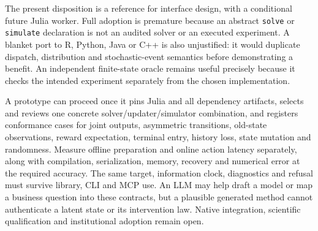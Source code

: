 The present disposition is a reference for interface design, with a conditional
future Julia worker. Full adoption is premature because an abstract
\texttt{solve} or \texttt{simulate} declaration is not an audited solver or
an executed experiment. A blanket port to R, Python, Java or C++ is also
unjustified: it would duplicate dispatch, distribution and stochastic-event
semantics before demonstrating a benefit. An independent finite-state oracle
remains useful precisely because it checks the intended experiment separately
from the chosen implementation.
\citep{exec23_pomdpsjl_sources,exec23_pomdpsjl_reference}

A prototype can proceed once it pins Julia and all dependency artifacts,
selects and reviews one concrete solver/updater/simulator combination, and
registers conformance cases for joint outputs, asymmetric transitions,
old-state observations, reward expectation, terminal entry, history loss,
state mutation and randomness. Measure offline preparation and online action
latency separately, along with compilation, serialization, memory, recovery
and numerical error at the required accuracy. The same target, information
clock, diagnostics and refusal must survive library, CLI and MCP use.
An LLM may help draft a model or map a business question into these contracts,
but a plausible generated method cannot authenticate a latent state or its
intervention law. Native integration, scientific qualification and institutional
adoption remain open.
\citep{exec23_pomdpsjl_sources}
